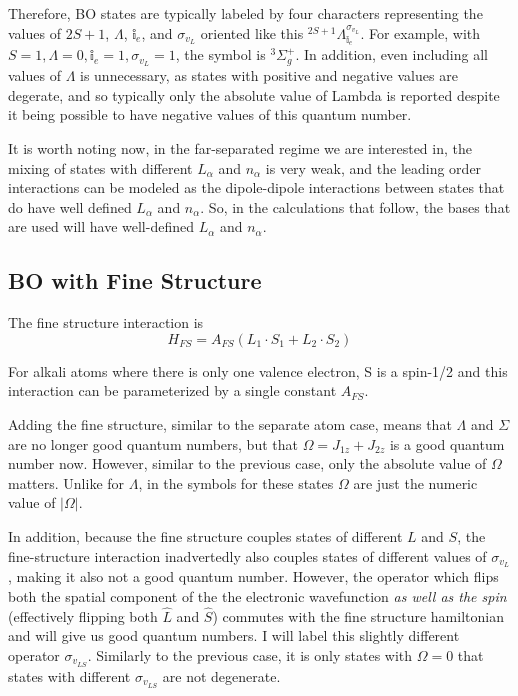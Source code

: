 \documentclass[prl, longbibliography]{revtex4-2}
\begin{document}
Therefore, BO states are typically labeled by four characters representing the values of $2S+1$, $\Lambda$, $\mathbb{i}_{e}$, and $\sigma_{v_L}$ oriented like this $^{2S+1}\Lambda^{\sigma_{v_L}}_{\mathbb{i}_e}$. For example, with $S=1,\Lambda=0,\mathbb{i}_e=1,\sigma_{v_L}=1$, the symbol is $^3\Sigma_g^+$. In addition, even including all values of $\Lambda$ is unnecessary, as states with positive and negative values are degerate, and so typically only the absolute value of Lambda is reported despite it being possible to have negative values of this quantum number.

It is worth noting now, in the far-separated regime we are interested in, the mixing of states with different $L_\alpha$ and $n_\alpha$ is very weak, and the leading order interactions can be modeled as the dipole-dipole interactions between states that do have well defined $L_\alpha$ and $n_\alpha$. So, in the calculations that follow, the bases that are used will have well-defined $L_\alpha$ and $n_\alpha$. 

\subsection{BO with Fine Structure}

The fine structure interaction is
$$
H_{FS} = A_{FS}(L_1\cdot S_1 + L_2 \cdot S_2)
$$

For alkali atoms where there is only one valence electron, S is a spin-1/2 and this interaction can be parameterized by a single constant $A_{FS}$.

Adding the fine structure, similar to the separate atom case, means that $\Lambda$ and $\Sigma$ are no longer good quantum numbers, but that $\Omega=J_{1z}+J_{2z}$ is a good quantum number now. However, similar to the previous case, only the absolute value of $\Omega$ matters. Unlike for $\Lambda$, in the symbols for these states $\Omega$ are just the numeric value of $|\Omega|$. 

In addition, because the fine structure couples states of different $L$ and $S$, the fine-structure interaction inadvertedly also couples states of different values of $\sigma_{v_L}$, making it also not a good quantum number. However, the operator which flips both the spatial component of the the electronic wavefunction \emph{as well as the spin} (effectively flipping both $\hat{L}$ and $\hat{S}$) commutes with the fine structure hamiltonian and will give us good quantum numbers. I will label this slightly different operator $\sigma_{v_{LS}}$. Similarly to the previous case, it is only states with $\Omega=0$ that states with different $\sigma_{v_{LS}}$ are not degenerate.
\end{document}
